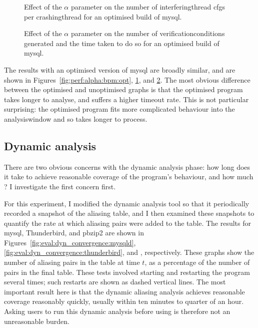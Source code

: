 \begin{figure}
  
  \caption{Effect of the $\alpha$ parameter on the number of
    \gls{interferingthread} \glspl{cfg} per \gls{crashingthread}
        {\StateMachine} for an optimised build of mysql.  }
  \label{fig:perf:alpha:gsc:opt}
\end{figure}

\begin{figure}
  
  \caption{Effect of the $\alpha$ parameter on the number of
    \glspl{verificationcondition} generated and the time taken to do
    so for an optimised build of mysql.}
  \label{fig:perf:alpha:gvc:opt}
\end{figure}

The results with an optimised version of mysql are broadly similar,
and are shown in Figures~\ref{fig:perf:alpha:bpm:opt},
\ref{fig:perf:alpha:gsc:opt}, and \ref{fig:perf:alpha:gvc:opt}.  The
most obvious difference between the optimised and unoptimised graphs
is that the optimised program takes longer to analyse, and suffers a
higher timeout rate.  This is not particular surprising: the optimised
program fits more complicated behaviour into the \gls{analysiswindow}
and so takes longer to process.  

\subsection{Dynamic analysis}

There are two obvious concerns with the dynamic analysis phase: how
long does it take to achieve reasonable coverage of the program's
behaviour, and how much ?  I investigate the first concern first.

For this experiment, I modified the dynamic analysis tool so that it
periodically recorded a snapshot of the aliasing table, and I then
examined these snapshots to quantify the rate at which aliasing pairs
were added to the table.  The results for mysql, Thunderbird, and
pbzip2 are shown in Figures~\ref{fig:eval:dyn_convergence:mysqld},
\ref{fig:eval:dyn_convergence:thunderbird}, and ,
respectively.  These graphs show the number of aliasing pairs in the
table at time $t$, as a percentage of the number of pairs in the final
table.  These tests involved starting and restarting the program
several times; such restarts are shown as dashed vertical lines.  The
most important result here is that the dynamic aliasing analysis
achieves reasonable coverage reasonably quickly, usually within ten
minutes to quarter of an hour.  Asking users to run this dynamic
analysis before using {\technique} is therefore not an unreasonable
burden.

